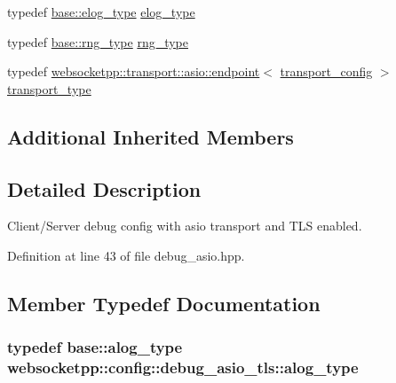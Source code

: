\begin{DoxyCompactItemize}
\item 
typedef \hyperlink{structwebsocketpp_1_1config_1_1debug__core_acfa1ded7f80d6a7276b0ec3fd0859fc3}{base\+::elog\+\_\+type} \hyperlink{structwebsocketpp_1_1config_1_1debug__asio__tls_a1f2ef75a6538ba22a7fbfa0749d3ad7e}{elog\+\_\+type}
\item 
typedef \hyperlink{structwebsocketpp_1_1config_1_1debug__core_ae59c72992beaef76957c8bfe407394e8}{base\+::rng\+\_\+type} \hyperlink{structwebsocketpp_1_1config_1_1debug__asio__tls_a31ca397251fac66cfe514e48802e3182}{rng\+\_\+type}
\item 
typedef \hyperlink{classwebsocketpp_1_1transport_1_1asio_1_1endpoint}{websocketpp\+::transport\+::asio\+::endpoint}$<$ \hyperlink{structwebsocketpp_1_1config_1_1debug__asio__tls_1_1transport__config}{transport\+\_\+config} $>$ \hyperlink{structwebsocketpp_1_1config_1_1debug__asio__tls_a9c9369aef0a393f0293d8a4a6192aaff}{transport\+\_\+type}
\end{DoxyCompactItemize}
\subsection*{Additional Inherited Members}


\subsection{Detailed Description}
Client/\+Server debug config with asio transport and T\+L\+S enabled. 

Definition at line 43 of file debug\+\_\+asio.\+hpp.



\subsection{Member Typedef Documentation}
\hypertarget{structwebsocketpp_1_1config_1_1debug__asio__tls_a317d8aab94f5283aa99873ce93eac381}{}
\subsubsection[{alog\+\_\+type}]{\setlength{\rightskip}{0pt plus 5cm}typedef {\bf base\+::alog\+\_\+type} {\bf websocketpp\+::config\+::debug\+\_\+asio\+\_\+tls\+::alog\+\_\+type}}\label{structwebsocketpp_1_1config_1_1debug__asio__tls_a317d8aab94f5283aa99873ce93eac381}


